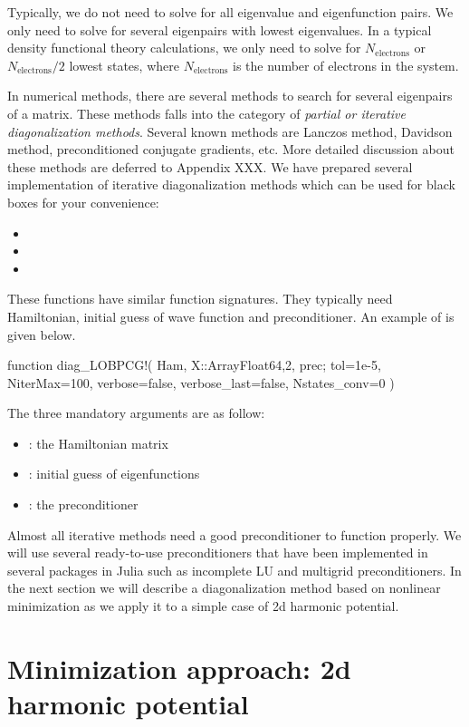 Typically, we do not need to solve for all eigenvalue and eigenfunction pairs.
We only need to solve for several eigenpairs with lowest eigenvalues. In a typical density
functional theory calculations, we only need to solve for $N_{\mathrm{electrons}}$ or
$N_{\mathrm{electrons}}/2$ lowest states, where $N_{\mathrm{electrons}}$ is the number
of electrons in the system.

In numerical methods, there are several methods to search for several eigenpairs
of a matrix. These methods falls into the category of \textit{partial or iterative
diagonalization methods}. Several known methods are Lanczos method, Davidson method,
preconditioned conjugate gradients, etc.
More detailed discussion about these methods are deferred to Appendix XXX.
We have prepared several implementation of iterative diagonalization methods
which can be used for black boxes for your convenience:
%
\begin{itemize}
\item {}
\item {}
\item {}
\end{itemize}
%
These functions have similar function signatures. They typically
need Hamiltonian, initial guess of wave function and preconditioner.
An example of  is given below.
%
\begin{juliacode}
function diag_LOBPCG!(
  Ham, X::Array{Float64,2}, prec;
  tol=1e-5, NiterMax=100, verbose=false,
  verbose_last=false, Nstates_conv=0
)
\end{juliacode}
%
The three mandatory arguments are as follow:
%
\begin{itemize}
\item {}: the Hamiltonian matrix
\item {}: initial guess of eigenfunctions
\item {}: the preconditioner
\end{itemize}

Almost all iterative methods need a good preconditioner to function properly.
We will use several ready-to-use preconditioners that have been implemented
in several packages in Julia such as incomplete LU and multigrid preconditioners.
In the next section we will describe a diagonalization method based
on nonlinear minimization as we apply it to a simple case of 2d harmonic
potential.


\section{Minimization approach: 2d harmonic potential}

